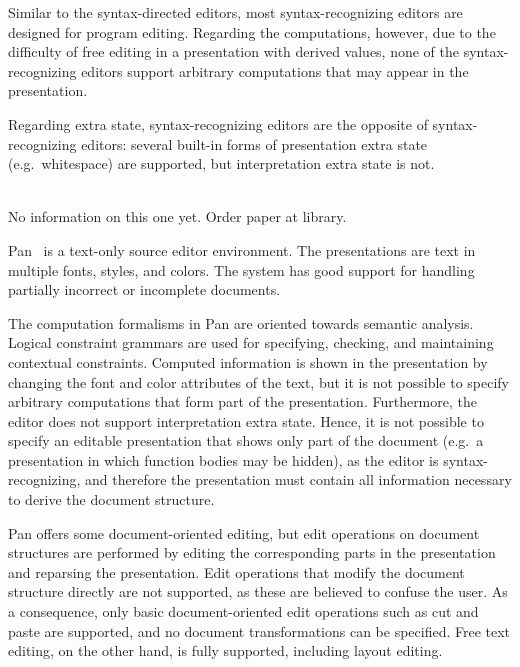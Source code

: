 \documentclass{speauth}
\begin{document}
Similar to the syntax-directed editors, most syntax-recognizing editors are designed for program editing. Regarding the computations, however, due to the difficulty of free editing in a presentation with derived values, none of the syntax-recognizing editors support arbitrary computations that may appear in the presentation.

Regarding extra state, syntax-recognizing editors are the opposite of syntax-recognizing editors: several built-in forms of presentation extra state (e.g.\ whitespace) are supported, but interpretation extra state is not. 

\bc
\toHere     %

\\

No information on this one yet. Order paper at library.

\fromHere  %
\ec


Pan~\cite{ballance92pan} is a text-only source editor environment. The presentations are text in multiple fonts, styles, and colors. The system has good support for handling partially incorrect or incomplete documents.

The computation formalisms in Pan are oriented towards semantic analysis. Logical constraint grammars are used for specifying, checking, and maintaining contextual constraints. Computed information is shown in the presentation by changing the font and color attributes of the text, but it is not possible to specify arbitrary computations that form part of the presentation. Furthermore, the editor does not support interpretation extra state. Hence, it is not possible to specify an editable presentation that shows only part of the document (e.g.\ a presentation in which function bodies may be hidden), as the editor is syntax-recognizing, and therefore the presentation must contain all information necessary to derive the document structure.

Pan offers some document-oriented editing, but edit operations on document structures are performed by editing the corresponding parts in the presentation and reparsing the presentation. Edit operations that modify the document structure directly are not supported, as these are believed to confuse the user. As a consequence, only basic document-oriented edit operations such as cut and paste are supported, and no document transformations can be specified. Free text editing, on the other hand, is fully supported, including layout editing. 
\end{document}
